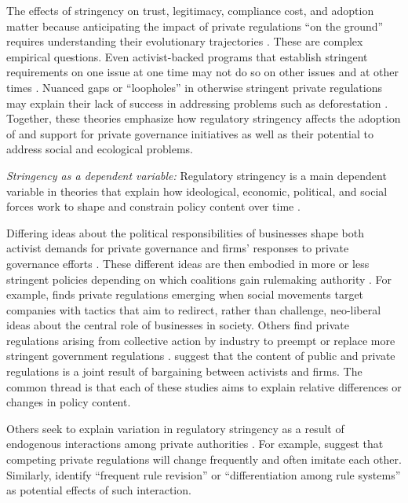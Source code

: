\documentclass[
      12pt,
            Review ]{article}
\begin{document}
The effects of stringency on trust, legitimacy, compliance cost, and adoption matter because anticipating the impact of private regulations ``on the ground'' requires understanding their evolutionary trajectories \citep{VanderVen2018}. These are complex empirical questions. Even activist-backed programs that establish stringent requirements on one issue at one time may not do so on other issues and at other times \citep{LeBaron2018}. Nuanced gaps or ``loopholes'' in otherwise stringent private regulations may explain their lack of success in addressing problems such as deforestation \citep{VanderVen2018}. Together, these theories emphasize how regulatory stringency affects the adoption of and support for private governance initiatives as well as their potential to address social and ecological problems.

\emph{Stringency as a dependent variable:} Regulatory stringency is a main dependent variable in theories that explain how ideological, economic, political, and social forces work to shape and constrain policy content over time \citep{Bartley2003, Cashore2004, Fischer2014}.

Differing ideas about the political responsibilities of businesses shape both activist demands for private governance and firms' responses to private governance efforts \citep{Bartley2003, Djelic2017}. These different ideas are then embodied in more or less stringent policies depending on which coalitions gain rulemaking authority \citep{Botzem2012, Hsueh2012}. For example, \citet{Bartley2003} finds private regulations emerging when social movements target companies with tactics that aim to redirect, rather than challenge, neo-liberal ideas about the central role of businesses in society. Others find private regulations arising from collective action by industry to preempt or replace more stringent government regulations \citep{Bartley2007, Cashore2002, Grabosky2013, Green2013, Loconto2014, Lyon2008, Maxwell2000, Prakash2000}. \citet{Abbott2009} suggest that the content of public and private regulations is a joint result of bargaining between activists and firms. The common thread is that each of these studies aims to explain relative differences or changes in policy content.

Others seek to explain variation in regulatory stringency as a result of endogenous interactions among private authorities \citep{DeLeon2009, Eberlein2014, Green2017, Gulbrandsen2014, Howard-Grenville2008, Li2015, Mills2016d}. For example, \citet{Smith2010} suggest that competing private regulations will change frequently and often imitate each other. Similarly, \citet{Eberlein2014} identify ``frequent rule revision'' or ``differentiation among rule systems'' as potential effects of such interaction.
\end{document}
